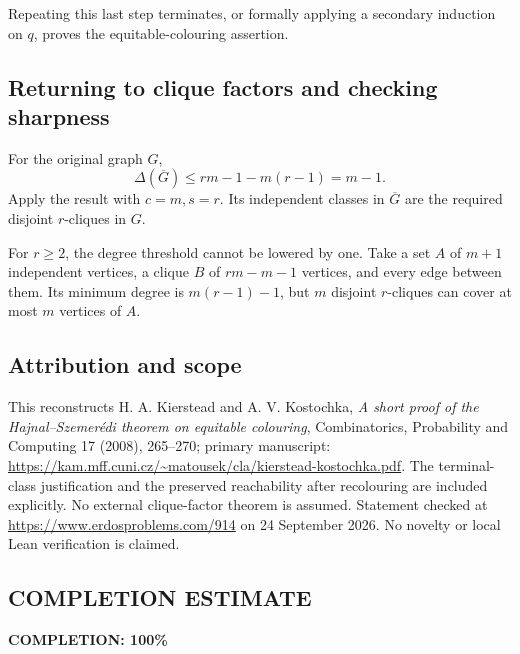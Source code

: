 Repeating this last step terminates, or formally applying a secondary induction on \(q\), proves the equitable-colouring assertion.

\subsection*{Returning to clique factors and checking sharpness}
For the original graph \(G\),
\[
\Delta(\overline G)\leq rm-1-m(r-1)=m-1.
\]
Apply the result with \(c=m,s=r\). Its independent classes in \(\overline G\) are the required disjoint \(r\)-cliques in \(G\).

For \(r\geq2\), the degree threshold cannot be lowered by one. Take a set \(A\) of \(m+1\) independent vertices, a clique \(B\) of \(rm-m-1\) vertices, and every edge between them. Its minimum degree is \(m(r-1)-1\), but \(m\) disjoint \(r\)-cliques can cover at most \(m\) vertices of \(A\).

\subsection*{Attribution and scope}
This reconstructs H. A. Kierstead and A. V. Kostochka, \emph{A short proof of the Hajnal--Szemer\'edi theorem on equitable colouring}, Combinatorics, Probability and Computing 17 (2008), 265--270; primary manuscript:
\url{https://kam.mff.cuni.cz/~matousek/cla/kierstead-kostochka.pdf}.
The terminal-class justification and the preserved reachability after recolouring are included explicitly. No external clique-factor theorem is assumed. Statement checked at \url{https://www.erdosproblems.com/914} on 24 September 2026. No novelty or local Lean verification is claimed.
\subsection*{COMPLETION ESTIMATE}
\textbf{COMPLETION: 100\%}

